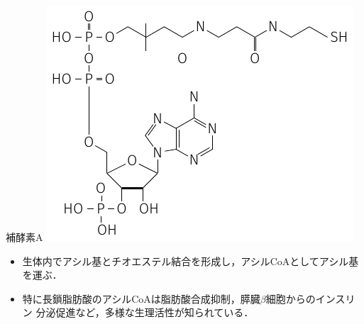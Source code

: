\documentclass[handout,xelatex,ja=standard,jafont=hiragino-pron,unicode,30pt]{beamer}
\begin{document}
\begin{frame}[t]{補酵素A}
\centering
\vspace{-0.2cm}
\includegraphics[width=0.6\hsize]{../main.pdf}
\begin{itemize}
\vspace{-0.2cm}
\item 生体内でアシル基とチオエステル結合を形成し，アシルCoAとしてアシル基を運ぶ．
\item 特に長鎖脂肪酸のアシルCoAは脂肪酸合成抑制，膵臓$\beta$細胞からのインスリン
		分泌促進など，多様な生理活性が知られている．
\end{itemize}
\end{frame}
\end{document}
